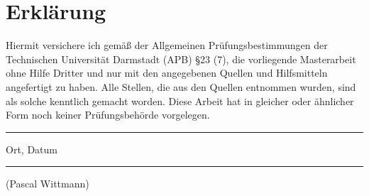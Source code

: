 \newpage
\thispagestyle{empty}
\section*{Erklärung}
Hiermit versichere ich gemäß der Allgemeinen Prüfungsbestimmungen der
Technischen Universität Darmstadt (APB) §23 (7), die vorliegende
Masterarbeit ohne Hilfe Dritter und nur mit den angegebenen Quellen
und Hilfsmitteln angefertigt zu haben. Alle Stellen, die aus den
Quellen entnommen wurden, sind als solche kenntlich gemacht worden.
Diese Arbeit hat in gleicher oder ähnlicher Form noch keiner
Prüfungsbehörde vorgelegen.
\vskip 1cm
\parbox{4cm}{\centering\hrule
\strut \centering\footnotesize Ort, Datum} \hfill\parbox{4cm}{\hrule
\strut \centering\footnotesize (Pascal Wittmann)}
\newpage

